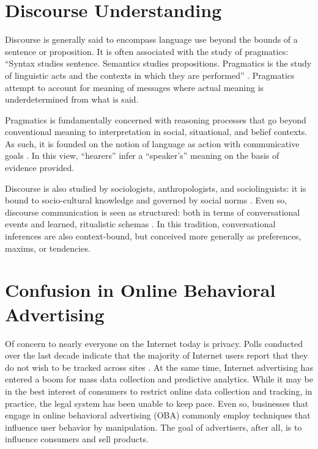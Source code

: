 \section{Discourse Understanding}
\label{discourseunderstanding}

Discourse is generally said to encompass language use beyond the bounds of a sentence or proposition. It is often associated with the study of pragmatics: ``Syntax studies sentence. Semantics studies propositions. Pragmatics is the study of linguistic acts and the contexts in which they are performed''  \citep[p. 34]{Stalnaker:1999vl}.  Pragmatics attempt to account for meaning of messages where actual meaning is underdetermined from what is said. 

Pragmatics is fundamentally concerned with reasoning processes that go beyond conventional meaning to interpretation in social, situational, and belief contexts. As such, it is founded on the notion of language as action with communicative goals  \citep{Grice:1975vz,Levinson:2000ud,Clark:1996tm}.  In this view, ``hearers'' infer a ``speaker's'' meaning on the basis of evidence provided.

\begin{sloppier}
Discourse is also studied by sociologists, anthropologists, and sociolinguists: it is bound to socio-cultural knowledge and governed by social norms \citep{Gumperz:1982tc,Hymes:1974wr}.  Even so, discourse communication is seen as structured: both in terms of conversational events and learned, ritualistic schemas \citep[e.g., making a reservation]{Goffman:1981tm}. In this tradition, conversational inferences are also context-bound, but conceived more generally as preferences, maxims, or tendencies.
\end{sloppier}


\section{Confusion in Online Behavioral Advertising}
\label{confusioninonlinebehavioraladvertising}

Of concern to nearly everyone on the Internet today is privacy. Polls conducted over the last decade indicate that the majority of Internet users report that they do not wish to be tracked across sites  \citep{Truste:2012uc}.  At the same time, Internet advertising has entered a boom for mass data collection and predictive analytics. While it may be in the best interest of consumers to restrict online data collection and tracking, in practice, the legal system has been unable to keep pace. Even so, businesses that engage in online behavioral advertising (OBA) commonly employ techniques that influence user behavior by manipulation. The goal of advertisers, after all, is to influence consumers and sell products. 

